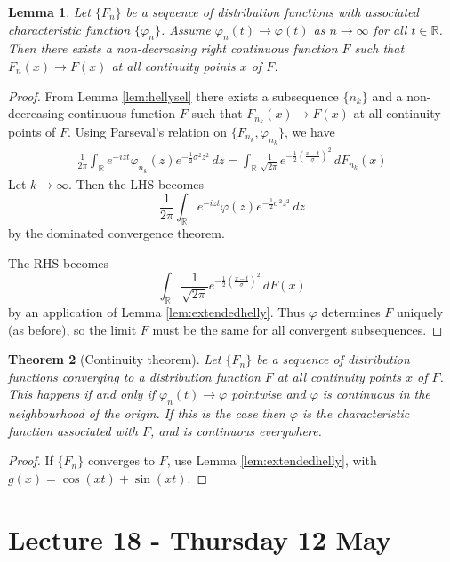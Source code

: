 \documentclass[10pt, oneside, reqno]{amsart}
\theoremstyle{plain}%
\newtheorem{thm}{Theorem}[section]
\newtheorem{lem}[thm]{Lemma}
\theoremstyle{definition}
\theoremstyle{remark}
\renewcommand{\phi}{\varphi}
\newcommand{\R}{\mathbb{R}}
\begin{document}
\begin{lem}
    Let $\{ F_n \}$ be a sequence of distribution functions with associated characteristic function $\{ \phi_n \}$.  Assume $\phi_n(t) \rightarrow \phi(t)$ as $n \rightarrow \infty$ for all $t \in \R$.  Then there exists a non-decreasing right continuous function $F$ such that $F_n(x) \rightarrow F(x)$ at all continuity points $x$ of $F$. 
\end{lem}
\begin{proof}
    From Lemma \ref{lem:hellysel} there exists a subsequence $\{ n_k \}$ and a non-decreasing continuous function $F$ such that $F_{n_k} (x) \rightarrow F(x)$ at all continuity points of $F$.  Using Parseval's relation on $\{ F_{n_k}, \phi_{n_k} \}$, we have \begin{align*}
        \frac{1}{2 \pi} \int_\R e^{-izt} \phi_{n_k}(z) e^{- \frac{1}{2} \sigma^2 z^2} \, dz = \int_\R \frac{1}{\sqrt{2 \pi}} e^{- \frac{1}{2} \left( \frac{x-t}{\sigma} \right)^2} \, dF_{n_k}(x)
    \end{align*}  Let $k \rightarrow \infty$.  Then the LHS becomes \[
        \frac{1}{2 \pi} \int_\R e^{-i z t} \phi(z) e^{- \frac{1}{2} \sigma^2 z^2} \, dz 
    \] by the dominated convergence theorem. 
    
    The RHS becomes \[
        \int_\R \frac{1}{\sqrt{2 \pi}} e^{- \frac{1}{2} \left( \frac{x-t}{\sigma} \right)^2} \, dF(x)
    \] by an application of Lemma \ref{lem:extendedhelly}.  Thus $\phi$ determines $F$ uniquely (as before), so the limit $F$ must be the same for all convergent subsequences.  
\end{proof}

\begin{thm}[Continuity theorem]
    Let $\{ F_n \}$ be a sequence of distribution functions converging to a distribution function $F$ at all continuity points $x$ of $F$.  This happens if and only if $\phi_n(t) \rightarrow \phi$ pointwise and $\phi$ is continuous in the neighbourhood of the origin.  If this is the case then $\phi$ is the characteristic function associated with $F$, and is continuous everywhere.
\end{thm}  

\begin{proof}
    If $\{ F_n \}$ converges to $F$, use Lemma \ref{lem:extendedhelly}, with $g(x) = \cos(xt) + \sin(xt)$.
\end{proof}

\section{Lecture 18 - Thursday 12 May} %
\label{sec:lecture_18_thursday_12_may}
\end{document}

